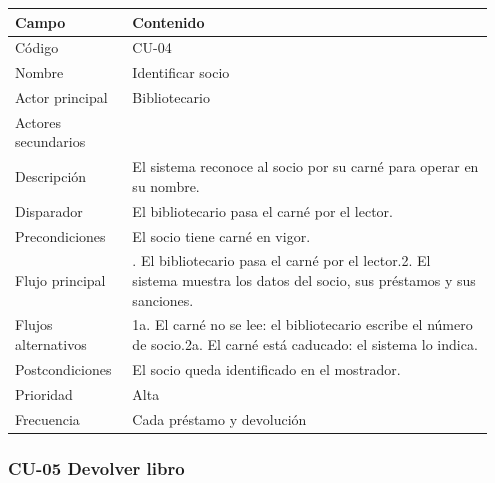 {\small
\begin{longtable}{@{}>{\raggedright\arraybackslash}p{0.232\linewidth}>{\raggedright\arraybackslash}p{0.717\linewidth}@{}}
\toprule
\textbf{Campo} & \textbf{Contenido} \\
\midrule
\endhead
Código & CU-04 \\
Nombre & Identificar socio \\
Actor principal & Bibliotecario \\
Actores secundarios &  \\
Descripción & El sistema reconoce al socio por su carné para operar en su nombre. \\
Disparador & El bibliotecario pasa el carné por el lector. \\
Precondiciones & El socio tiene carné en vigor. \\
Flujo principal & 1. El bibliotecario pasa el carné por el lector.\newline{}2. El sistema muestra los datos del socio, sus préstamos y sus sanciones. \\
Flujos alternativos & 1a. El carné no se lee: el bibliotecario escribe el número de socio.\newline{}2a. El carné está caducado: el sistema lo indica. \\
Postcondiciones & El socio queda identificado en el mostrador. \\
Prioridad & Alta \\
Frecuencia & Cada préstamo y devolución \\
\bottomrule
\end{longtable}}

\subsubsection*{CU-05 Devolver libro}

